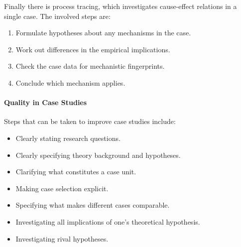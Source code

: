 Finally there is process tracing, which investigates cause-effect relations in a single case. The involved steps are:
\begin{enumerate}
	\item Formulate hypotheses about any mechanisms in the case.
	\item Work out differences in the empirical implications.
	\item Check the case data for mechanistic fingerprints.
	\item Conclude which mechanism applies.	
\end{enumerate}

\paragraph{Quality in Case Studies}
Steps that can be taken to improve case studies include:
\begin{itemize}
	\item Clearly stating research questions.
	\item Clearly specifying theory background and hypotheses.
	\item Clarifying what constitutes a case unit.
	\item Making case selection explicit.
	\item Specifying what makes different cases comparable.
	\item Investigating all implications of one's theoretical hypothesis.
	\item Investigating rival hypotheses.
\end{itemize}